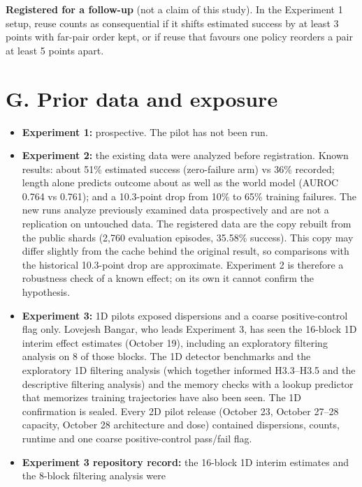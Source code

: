 \documentclass[10pt,letterpaper]{article}
\providecommand{\tightlist}{\setlength{\itemsep}{0pt}\setlength{\parskip}{0pt}}
\begin{document}
\textbf{Registered for a follow-up} (not a claim of this
study). In the Experiment 1 setup, reuse counts as
consequential if it shifts estimated success by at least 3
points with far-pair order kept, or if reuse that favours
one policy reorders a pair at least 5 points apart.

\hypertarget{g.-prior-data-and-exposure}{%
\section{G. Prior data and
exposure}\label{g.-prior-data-and-exposure}}

\begin{itemize}
\tightlist
\item
  \textbf{Experiment 1:} prospective. The pilot has not been
  run.
\item
  \textbf{Experiment 2:} the existing data were analyzed
  before registration. Known results: about 51\% estimated
  success (zero-failure arm) vs 36\% recorded; length alone
  predicts outcome about as well as the world model (AUROC
  0.764 vs 0.761); and a 10.3-point drop from 10\% to 65\%
  training failures. The new runs analyze previously
  examined data prospectively and are not a replication on
  untouched data. The registered data are the copy rebuilt
  from the public shards (2,760 evaluation episodes, 35.58\%
  success). This copy may differ slightly from the cache
  behind the original result, so comparisons with the
  historical 10.3-point drop are approximate. Experiment 2
  is therefore a robustness check of a known effect; on its
  own it cannot confirm the hypothesis.
\item
  \textbf{Experiment 3:} 1D pilots exposed dispersions and a
  coarse positive-control flag only. Lovejesh Bangar, who
  leads Experiment 3, has seen the 16-block 1D interim
  effect estimates (October 19), including an exploratory
  filtering analysis on 8 of those blocks. The 1D detector
  benchmarks and the exploratory 1D filtering analysis
  (which together informed H3.3--H3.5 and the descriptive
  filtering analysis) and the memory checks with a lookup
  predictor that memorizes training trajectories have also
  been seen. The 1D confirmation is sealed. Every 2D pilot
  release (October 23, October 27--28 capacity, October 28
  architecture and dose) contained dispersions, counts,
  runtime and one coarse positive-control pass/fail flag.
\item
  \textbf{Experiment 3 repository record:} the 16-block 1D
  interim estimates and the 8-block filtering analysis were

\end{itemize}
\end{document}
